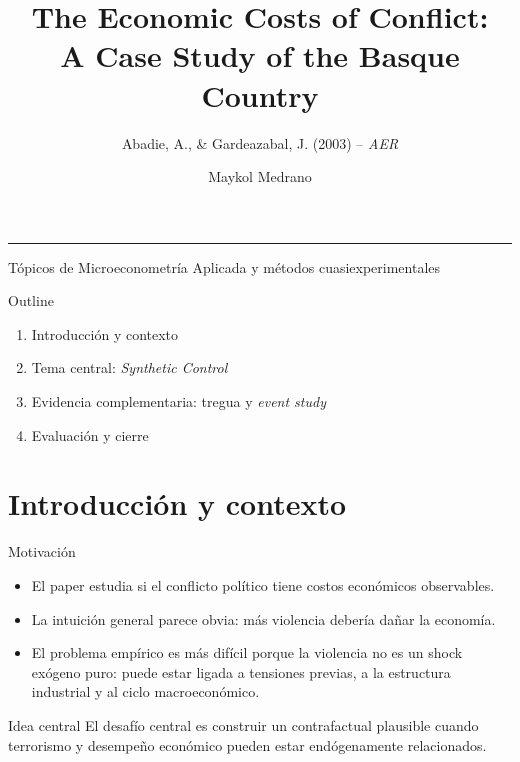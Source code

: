 \documentclass[aspectratio=1610]{beamer}
\title[Costs of Conflict]{The Economic Costs of Conflict:\\A Case Study of the Basque Country}
\subtitle{Abadie, A., \& Gardeazabal, J. (2003) -- \textit{AER}}
\author[Maykol Medrano]{Maykol Medrano}
\institute[Instituto de Economia UC]{Instituto de Economía\\Pontificia Universidad Católica de Chile}
\date{\fechaautomatica}
\newcommand{\courseinfo}{Tópicos de Microeconometría Aplicada y métodos cuasiexperimentales}
\begin{document}
\begin{frame}[plain]
    \vspace{0.8cm}
    {\raggedright{}\LARGE\color{ritsumeikan}\inserttitle\par}
    \vspace{0.3cm}
    {\raggedright\large\itshape\insertsubtitle\par}
    \vspace{0.35cm}

    {\color{ritsumeikan}\rule{0.88\linewidth}{1.1pt}\par}

    \vspace{1.25cm}
    {\normalsize\textbf{\insertauthor}\par}
    \vspace{0.2cm}
    {\small\insertdate\par}

    \vfill

    {\small\insertinstitute\par}

    \vspace{0.35cm}
    {\footnotesize\courseinfo\par}
\end{frame}

\begin{frame}{Outline}
    \vspace{0.2cm}
    \footnotesize
    \begin{enumerate}
        \item Introducción y contexto
        \item Tema central: \emph{Synthetic Control}
        \item Evidencia complementaria: tregua y \emph{event study}
        \item Evaluación y cierre
    \end{enumerate}
\end{frame}

\section{Introducción y contexto}

\begin{frame}{Motivación}
    \begin{itemize}
        \item El paper estudia si el conflicto político tiene costos económicos observables.
        \item La intuición general parece obvia: más violencia debería dañar la economía.
        \item El problema empírico es más difícil porque la violencia no es un shock exógeno puro: puede estar ligada a tensiones previas, a la estructura industrial y al ciclo macroeconómico.
    \end{itemize}
    \begin{block}{Idea central}
        El desafío central es construir un contrafactual plausible cuando terrorismo y desempeño económico pueden estar endógenamente relacionados.
    \end{block}
\end{frame}
\end{document}
